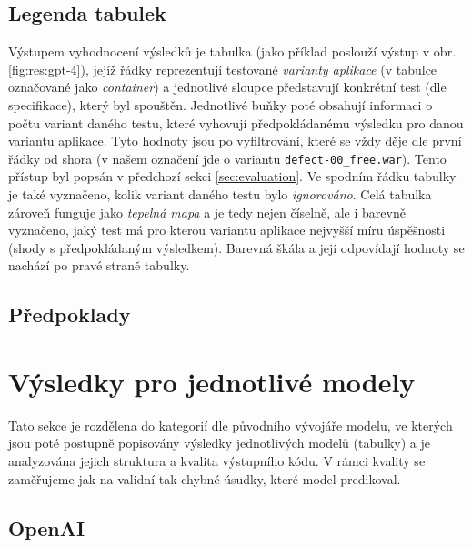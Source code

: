 \documentclass[czech, ma, kiv, he, iso690alph, pdf, viewonly]{fasthesis}
\begin{document}
        \subsection{Legenda tabulek} \label{sec:plot_legend}

        Výstupem vyhodnocení výsledků je tabulka (jako příklad poslouží výstup v obr. \ref{fig:res:gpt-4}), jejíž řádky reprezentují testované \textit{varianty aplikace} (v tabulce označované jako \emph{container}) a jednotlivé sloupce představují konkrétní test (dle specifikace), který byl spouštěn. Jednotlivé buňky poté obsahují informaci o počtu variant daného testu, které vyhovují předpokládanému výsledku pro danou variantu aplikace. Tyto hodnoty jsou po vyfiltrování, které se vždy děje dle první řádky od shora (v našem označení jde o variantu \verb|defect-00_free.war|). Tento přístup byl popsán v předchozí sekci \ref{sec:evaluation}. Ve spodním řádku tabulky je také vyznačeno, kolik variant daného testu bylo \emph{ignorováno}. Celá tabulka zároveň funguje jako \textit{tepelná mapa} a je tedy nejen číselně, ale i barevně vyznačeno, jaký test má pro kterou variantu aplikace nejvyšší míru úspěšnosti (shody s předpokládaným výsledkem). Barevná škála a její odpovídají hodnoty se nachází po pravé straně tabulky.

        \subsection{Předpoklady}


    \section{Výsledky pro jednotlivé modely}

        Tato sekce je rozdělena do kategorií dle původního vývojáře modelu, ve kterých jsou poté postupně popisovány výsledky jednotlivých modelů (tabulky) a je analyzována jejich struktura a kvalita výstupního kódu. V rámci kvality se zaměřujeme jak na validní tak chybné úsudky, které model predikoval.
    
        \subsection{OpenAI} \label{sec:res:openai}
\end{document}
